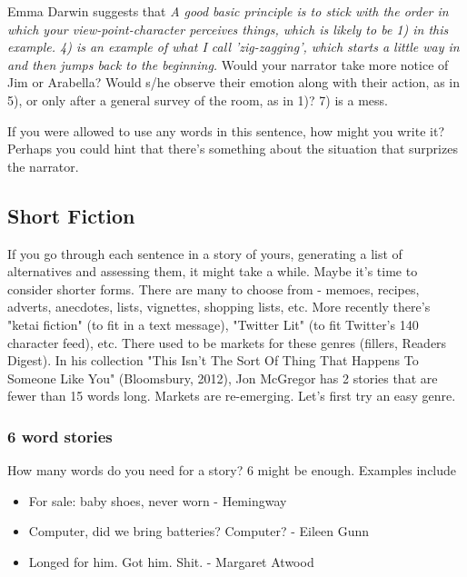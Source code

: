 \documentclass[11pt]{article}
\begin{document}
Emma Darwin suggests that \textit{A good basic principle is to stick with the order in which your view-point-character perceives things, which is likely to be 1) in this example. 4) is an example of what I call 'zig-zagging', which starts a little way in and then jumps back to the beginning.} Would your narrator take more notice of Jim or Arabella? Would s/he observe their emotion along with their action, as in 5), or only after a general survey of the room, as in 1)? 7) is a mess.




If you were allowed to use any words in this sentence, how might you write it? Perhaps you could hint that there's something about the situation that surprizes the narrator.




\subsection*{Short Fiction}

If you go through each sentence in a story of yours, generating a list of alternatives and assessing them, it might take a while. Maybe it's time to consider shorter forms.  There are many to choose from - memoes, recipes, adverts, anecdotes, lists, vignettes, shopping lists, etc. More recently there's "ketai fiction" (to fit in a text message), "Twitter Lit" (to fit Twitter's 140 character feed), etc. There used to be markets for these genres (fillers, Readers Digest). In his collection "This Isn't The Sort Of Thing That Happens To Someone Like You" (Bloomsbury, 2012), Jon McGregor has 2 stories that are fewer than 15 words long. Markets are re-emerging. Let's first try an easy genre.



\subsubsection*{6 word stories}
How many words do you need for a story? 6 might be enough.  Examples include


\begin{itemize}

\item  For sale: baby shoes, never worn -  Hemingway

\item  Computer, did we bring batteries? Computer?  - Eileen Gunn

\item  Longed for him. Got him. Shit.  - Margaret Atwood
\end{itemize}
\end{document}
